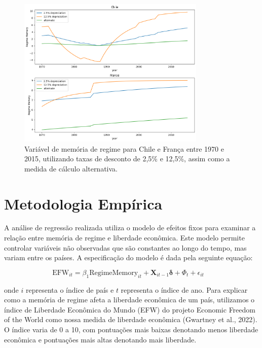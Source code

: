 \begin{figure}[h!]
    \centering
    \caption{Variável de memória de regime para Chile e França entre 1970 e 2015, utilizando taxas de desconto de 2,5\% e 12,5\%, assim como a medida de cálculo alternativa.}
    \includegraphics[width=0.8\textwidth]{Textuais/chile.png}
\end{figure}

\section{Metodologia Empírica}

A análise de regressão realizada utiliza o modelo de efeitos fixos para examinar a relação entre memória de regime e liberdade econômica. Este modelo permite controlar variáveis não observadas que são constantes ao longo do tempo, mas variam entre os países. A especificação do modelo é dada pela seguinte equação:

\begin{equation}
    \text{EFW}_{it} = \beta_1 \text{RegimeMemory}_{it} + \mathbf{X}_{it-1} \boldsymbol{\delta} + \Phi_t + \epsilon_{it} \quad 
\end{equation}

onde $i$ representa o índice de país e $t$ representa o índice de ano. Para explicar como a memória de regime afeta a liberdade econômica de um país, utilizamos o índice de Liberdade Econômica do Mundo (EFW) do projeto Economic Freedom of the World como nossa medida de liberdade econômica (Gwartney et al., 2022). O índice varia de 0 a 10, com pontuações mais baixas denotando menos liberdade econômica e pontuações mais altas denotando mais liberdade.


